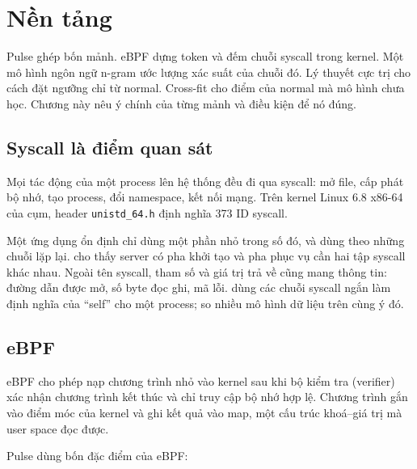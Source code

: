 \chapter{Nền tảng}

Pulse ghép bốn mảnh. eBPF dựng token và đếm chuỗi syscall trong kernel. Một mô hình ngôn ngữ n-gram ước lượng xác suất của chuỗi đó. Lý thuyết cực trị cho cách đặt ngưỡng chỉ từ normal. Cross-fit cho điểm của normal mà mô hình chưa học. Chương này nêu ý chính của từng mảnh và điều kiện để nó đúng.

\section{Syscall là điểm quan sát}

Mọi tác động của một process lên hệ thống đều đi qua syscall: mở file, cấp phát bộ nhớ, tạo process, đổi namespace, kết nối mạng. Trên kernel Linux 6.8 x86-64 của cụm, header \texttt{unistd\_\allowbreak{}64.\allowbreak{}h} định nghĩa 373 ID syscall.

Một ứng dụng ổn định chỉ dùng một phần nhỏ trong số đó, và dùng theo những chuỗi lặp lại. \citet{ghavamnia2020b} cho thấy server có pha khởi tạo và pha phục vụ cần hai tập syscall khác nhau. Ngoài tên syscall, tham số và giá trị trả về cũng mang thông tin: đường dẫn được mở, số byte đọc ghi, mã lỗi. \citet{forrest1996} dùng các chuỗi syscall ngắn làm định nghĩa của ``self'' cho một process; \citet{warrender1999} so nhiều mô hình dữ liệu trên cùng ý đó.

\section{eBPF}

eBPF cho phép nạp chương trình nhỏ vào kernel sau khi bộ kiểm tra (verifier) xác nhận chương trình kết thúc và chỉ truy cập bộ nhớ hợp lệ. Chương trình gắn vào điểm móc của kernel và ghi kết quả vào map, một cấu trúc khoá--giá trị mà user space đọc được.

Pulse dùng bốn đặc điểm của eBPF:

